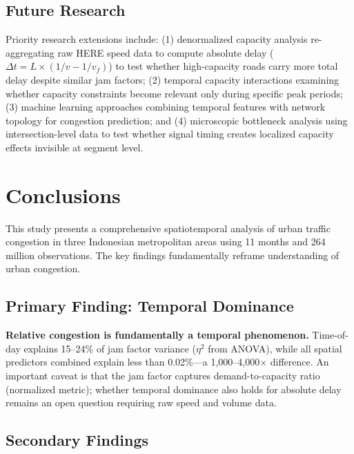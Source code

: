 \documentclass[12pt,a4paper]{article}
\begin{document}
\subsection{Future Research}

Priority research extensions include: (1) denormalized capacity analysis re-aggregating raw HERE speed data to compute absolute delay ($\Delta t = L \times (1/v - 1/v_f)$) to test whether high-capacity roads carry more total delay despite similar jam factors; (2) temporal capacity interactions examining whether capacity constraints become relevant only during specific peak periods; (3) machine learning approaches combining temporal features with network topology for congestion prediction; and (4) microscopic bottleneck analysis using intersection-level data to test whether signal timing creates localized capacity effects invisible at segment level.



\section{Conclusions}

This study presents a comprehensive spatiotemporal analysis of urban traffic congestion in three Indonesian metropolitan areas using 11 months and 264 million observations. The key findings fundamentally reframe understanding of urban congestion.

\subsection{Primary Finding: Temporal Dominance}

\textbf{Relative congestion is fundamentally a temporal phenomenon.} Time-of-day explains 15--24\% of jam factor variance ($\eta^2$ from ANOVA), while all spatial predictors combined explain less than 0.02\%---a 1,000--4,000$\times$ difference. An important caveat is that the jam factor captures demand-to-capacity ratio (normalized metric); whether temporal dominance also holds for absolute delay remains an open question requiring raw speed and volume data.

\subsection{Secondary Findings}
\end{document}
